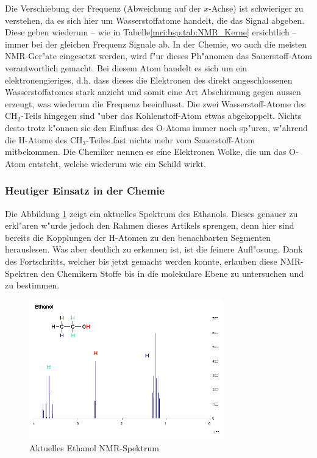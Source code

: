 Die Verschiebung der Frequenz (Abweichung auf der $x$-Achse) ist schwieriger zu verstehen, da es sich hier um Wasserstoffatome handelt, die das Signal abgeben. Diese geben wiederum -- wie in Tabelle\;\ref{mri:bsp:tab:NMR_Kerne} ersichtlich -- immer bei der gleichen Frequenz Signale ab. In der Chemie, wo auch die meisten NMR-Ger"ate eingesetzt werden, wird f"ur dieses Ph"anomen das Sauerstoff-Atom verantwortlich gemacht. Bei diesem Atom handelt es sich um ein elektronengieriges, d.h. dass dieses die Elektronen des direkt angeschlossenen Wasserstoffatomes stark anzieht und somit eine Art Abschirmung gegen aussen erzeugt, was wiederum die Frequenz beeinflusst. Die zwei Wasserstoff-Atome des $\mathrm{CH_2}$-Teils hingegen sind "uber das Kohlenstoff-Atom etwas abgekoppelt. Nichts desto trotz k"onnen sie den Einfluss des O-Atoms immer noch sp"uren, w"ahrend die H-Atome des $\mathrm{CH_3}$-Teiles fast nichts mehr vom Sauerstoff-Atom mitbekommen. Die Chemiker nennen es eine Elektronen Wolke, die um das O-Atom entsteht, welche wiederum wie ein Schild wirkt.

\subsubsection{Heutiger Einsatz in der Chemie}
Die Abbildung \ref{mri:bsp:abb:EtanolspektrumNew} zeigt ein aktuelles Spektrum des Ethanols. Dieses genauer zu erkl"aren w"urde jedoch den Rahmen dieses Artikels sprengen, denn hier sind bereits die Kopplungen der H-Atomen zu den benachbarten Segmenten herauslesen. Was aber deutlich zu erkennen ist, ist die feinere Aufl"osung. Dank des Fortschritts, welcher bis jetzt gemacht werden konnte, erlauben diese NMR-Spektren den Chemikern Stoffe bis in die molekulare Ebene zu untersuchen und zu bestimmen. 
\begin{figure}[h]
	\centering
	\includegraphics[width = 0.75\textwidth]{./mri/pic/CW_SpektrumEthanol_Neu.png}
	\caption{Aktuelles Ethanol NMR-Spektrum \cite{skript:mri:EthanolNeu}}
	\label{mri:bsp:abb:EtanolspektrumNew}
\end{figure}